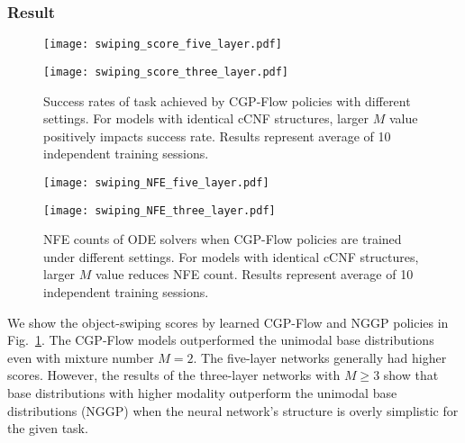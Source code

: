 \documentclass[sn-mathphys-num]{sn-jnl}
\begin{document}
\subsubsection{Result}
\begin{figure}[t]
    \centering
    \begin{minipage}[b]{0.49\hsize}
        \centering
        \texttt{[image: swiping\_score\_five\_layer.pdf]}
        \label{fig:swiping:sucess rate:a}
    \end{minipage}
    \begin{minipage}[b]{0.49\hsize}
        \centering
        \texttt{[image: swiping\_score\_three\_layer.pdf]}
        \label{fig:swiping:sucess rate:b}
    \end{minipage}
    \vspace{-3mm}
    \caption{Success rates of task achieved by CGP-Flow policies with different settings. For models with identical cCNF structures, larger $M$ value positively impacts success rate. Results represent average of 10 independent training sessions.}
    \label{fig:swiping:sucess rate}
\end{figure}
\begin{figure}[t]
    \centering
    \begin{minipage}[b]{0.49\hsize}
        \centering
        \texttt{[image: swiping\_NFE\_five\_layer.pdf]}
        \label{fig:swipping:nfe:a}
    \end{minipage}
    \begin{minipage}[b]{0.49\hsize}
        \centering
        \texttt{[image: swiping\_NFE\_three\_layer.pdf]}
        \label{fig:swipping:nfe:b}
    \end{minipage}
    \vspace{-3mm}
    \caption{NFE counts of ODE solvers when CGP-Flow policies are trained under different settings. For models with identical cCNF structures, larger $M$ value reduces NFE count. Results represent average of 10 independent training sessions.}
    \label{fig:swipping:nfe}
\end{figure}

We show the object-swiping scores by learned CGP-Flow and NGGP policies in Fig.~\ref{fig:swiping:sucess rate}.
The CGP-Flow models outperformed the unimodal base distributions even with mixture number $M=2$. The five-layer networks generally had higher scores.
However, the results of the three-layer networks with $M\geq3$ show that base distributions with higher modality outperform the unimodal base distributions (NGGP) when the neural network's structure is overly simplistic for the given task.
\end{document}
